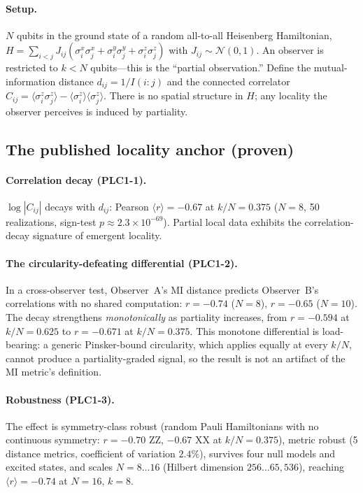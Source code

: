 \documentclass[aps,pra,twocolumn,superscriptaddress,floatfix]{revtex4-2}
\theoremstyle{definition}
\begin{document}
\paragraph{Setup.}
$N$ qubits in the ground state of a random all-to-all Heisenberg Hamiltonian,
$H=\sum_{i<j}J_{ij}(\sigma^x_i\sigma^x_j+\sigma^y_i\sigma^y_j+\sigma^z_i\sigma^z_j)$
with $J_{ij}\sim\mathcal{N}(0,1)$. An observer is restricted to $k<N$
qubits---this is the ``partial observation.'' Define the mutual-information
distance $d_{ij}=1/I(i{:}j)$ and the connected correlator
$C_{ij}=\langle\sigma^z_i\sigma^z_j\rangle-\langle\sigma^z_i\rangle\langle\sigma^z_j\rangle$.
There is no spatial structure in $H$; any locality the observer perceives is
induced by partiality.

\subsection{The published locality anchor (proven)}

\paragraph{Correlation decay (PLC1-1).}
$\log|C_{ij}|$ decays with $d_{ij}$: Pearson $\langle r\rangle=-0.67$ at
$k/N=0.375$ ($N=8$, 50 realizations, sign-test $p\approx2.3\times10^{-69}$).
Partial local data exhibits the correlation-decay signature of emergent
locality.

\paragraph{The circularity-defeating differential (PLC1-2).}
In a cross-observer test, Observer~A's MI distance predicts Observer~B's
correlations with no shared computation: $r=-0.74$ ($N=8$), $r=-0.65$
($N=10$). The decay strengthens \emph{monotonically} as partiality increases,
from $r=-0.594$ at $k/N=0.625$ to $r=-0.671$ at $k/N=0.375$. This monotone
differential is load-bearing: a generic Pinsker-bound circularity, which applies
equally at every $k/N$, cannot produce a partiality-graded signal, so the result
is not an artifact of the MI metric's definition.

\paragraph{Robustness (PLC1-3).}
The effect is symmetry-class robust (random Pauli Hamiltonians with no
continuous symmetry: $r=-0.70$ ZZ, $-0.67$ XX at $k/N=0.375$), metric robust (5
distance metrics, coefficient of variation $2.4\%$), survives four null models
and excited states, and scales $N=8\ldots16$ (Hilbert dimension
$256\ldots65{,}536$), reaching $\langle r\rangle=-0.74$ at $N=16,\,k=8$.
\end{document}
